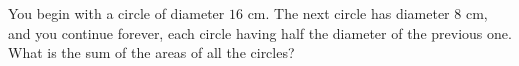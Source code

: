 You begin with a circle of diameter $16$ cm. The next circle has diameter $8$ cm, and you continue forever, each circle having half the diameter of the previous one. What is the sum of the areas of all the circles?
